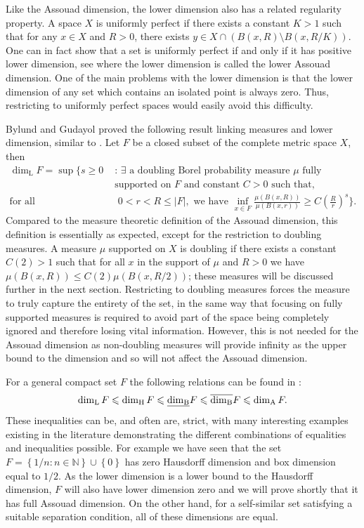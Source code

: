 Like the Assouad dimension, the lower dimension also has a related regularity property. A space $X$ is uniformly perfect if there exists a constant $K > 1$ such that for any $x \in X$ and $R > 0$, there exists $y \in X \cap \left(B(x, R) \setminus B(x, R/K)\right)$. One can in fact show that a set is uniformly perfect if and only if it has positive lower dimension, see \cite[Lemma 2.1]{anti1} where the lower dimension is called the lower Assouad dimension. One of the main problems with the lower dimension is that the lower dimension of any set which contains an isolated point is always zero. Thus, restricting to uniformly perfect spaces would easily avoid this difficulty. 

Bylund and Gudayol \cite{bylund} proved the following result linking measures and lower dimension, similar to \cite{luksak, konyagin}. Let $F$ be a closed subset of the complete metric space $X$, then
\begin{align*}
\dim_{\text{L}} F = \sup \Bigg\{ s \geq 0 \, \,  &: \, \exists \text{ a doubling Borel probability measure } \mu \text{ fully } \\  
&\text{supported on }F \text{ and constant }C > 0  \text{ such that, } \\ 
\text{for all } &\, \, 0< r< R \leq \lvert F \rvert, \text{ we have  }\inf_{x\in F} \frac{\mu(B(x,R))}{\mu(B(x,r))} \geq C\left(\frac{R}{r}\right)^{s} \Bigg\}.
\end{align*}
Compared to the measure theoretic definition of the Assouad dimension, this definition is essentially as expected, except for the restriction to doubling measures. A measure $\mu$ supported on $X$ is doubling if there exists a constant $C(2) > 1$ such that for all $x$ in the support of $\mu$ and $R > 0$ we have $\mu( B(x,R)) \le C(2) \mu(B(x,R/2))$; these measures will be discussed further in the next section. Restricting to doubling measures forces the measure to truly capture the entirety of the set, in the same way that focusing on fully supported measures is required to avoid part of the space being completely ignored and therefore losing vital information. However, this is not needed for the Assouad dimension as non-doubling measures will provide infinity as the upper bound to the dimension and so will not affect the Assouad dimension. 


For a general compact set $F$ the following relations can be found in \cite{falconer, larman1, larman2}:
\[
\dim_{\textup{L}} F \leqslant \dim_{\text{H}} F \leqslant \underline{\dim_{\textup{B}}} F \leqslant \overline{\dim_{\textup{B}}} F \leqslant \dim_{\textup{A}} F.
\]
These inequalities can be, and often are, strict, with many interesting examples existing in the literature demonstrating the different combinations of equalities and inequalities possible. For example we have seen that the set $F=\left\{1/n \colon n \in \mathbb{N} \right\} \cup \left\{0 \right\}$ has zero Hausdorff dimension and box dimension equal to $1/2$. As the lower dimension is a lower bound to the Hausdorff dimension, $F$ will also have lower dimension zero and we will prove shortly that it has full Assouad dimension. On the other hand, for a self-similar set satisfying a suitable separation condition, all of these dimensions are equal. 

